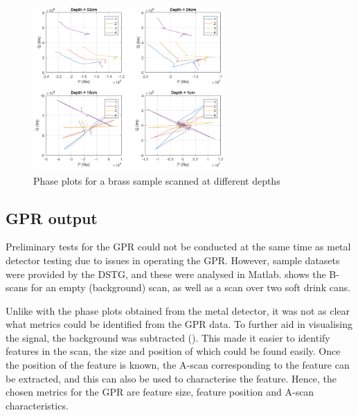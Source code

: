 \documentclass[main.tex]{subfiles}
\begin{document}
\begin{figure}[ht]
\includegraphics[width=0.65\textwidth]{3-ConceptDesign/phaseDepth.PNG}
\centering
\caption{Phase plots for a brass sample scanned at different depths} 
\end{figure}

\subsection{GPR output}
Preliminary tests for the GPR could not be conducted at the same time as metal detector testing due to issues in operating the GPR. However, sample datasets were provided by the DSTG, and these were analysed in Matlab.  shows the B-scans for an empty (background) scan, as well as a scan over two soft drink cans. 

Unlike with the phase plots obtained from the metal detector, it was not as clear what metrics could be identified from the GPR data. To further aid in visualising the signal, the background was subtracted (). This made it easier to identify features in the scan, the size and position of which could be found easily. Once the position of the feature is known, the A-scan corresponding to the feature can be extracted, and this can also be used to characterise the feature. Hence, the chosen metrics for the GPR are feature size, feature position and A-scan characteristics.
\end{document}
